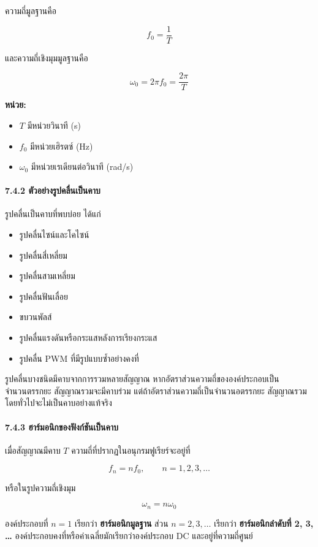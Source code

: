 ความถี่มูลฐานคือ

\[
f_0=\frac{1}{T}
\]

และความถี่เชิงมุมมูลฐานคือ

\[
\omega_0=2\pi f_0=\frac{2\pi}{T}
\]

\textbf{หน่วย:}

\begin{itemize}
\item
  \(T\) มีหน่วยวินาที (s)
\item
  \(f_0\) มีหน่วยเฮิรตซ์ (Hz)
\item
  \(\omega_0\) มีหน่วยเรเดียนต่อวินาที (rad/s)
\end{itemize}

\paragraph{7.4.2 ตัวอย่างรูปคลื่นเป็นคาบ}

รูปคลื่นเป็นคาบที่พบบ่อย ได้แก่

\begin{itemize}
\item
  รูปคลื่นไซน์และโคไซน์
\item
  รูปคลื่นสี่เหลี่ยม
\item
  รูปคลื่นสามเหลี่ยม
\item
  รูปคลื่นฟันเลื่อย
\item
  ขบวนพัลส์
\item
  รูปคลื่นแรงดันหรือกระแสหลังการเรียงกระแส
\item
  รูปคลื่น PWM ที่มีรูปแบบซ้ำอย่างคงที่
\end{itemize}

รูปคลื่นบางชนิดมีคาบจากการรวมหลายสัญญาณ หากอัตราส่วนความถี่ขององค์ประกอบเป็นจำนวนตรรกยะ สัญญาณรวมจะมีคาบร่วม แต่ถ้าอัตราส่วนความถี่เป็นจำนวนอตรรกยะ สัญญาณรวมโดยทั่วไปจะไม่เป็นคาบอย่างแท้จริง

\paragraph{7.4.3 ฮาร์มอนิกของฟังก์ชันเป็นคาบ}

เมื่อสัญญาณมีคาบ \(T\) ความถี่ที่ปรากฏในอนุกรมฟูเรียร์จะอยู่ที่

\[
f_n=nf_0,\qquad n=1,2,3,\ldots
\]

หรือในรูปความถี่เชิงมุม

\[
\omega_n=n\omega_0
\]

องค์ประกอบที่ \(n=1\) เรียกว่า \textbf{ฮาร์มอนิกมูลฐาน} ส่วน \(n=2,3,\ldots\) เรียกว่า \textbf{ฮาร์มอนิกลำดับที่ 2, 3, \ldots{}} องค์ประกอบคงที่หรือค่าเฉลี่ยมักเรียกว่าองค์ประกอบ DC และอยู่ที่ความถี่ศูนย์

